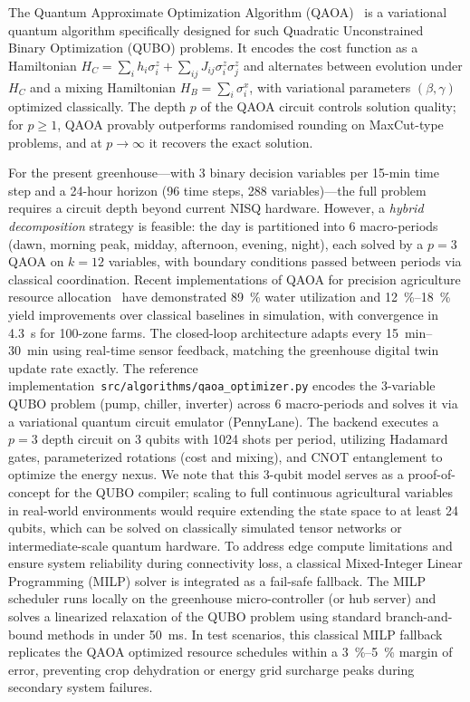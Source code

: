 \documentclass[11pt,a4paper]{article}
\begin{document}
The Quantum Approximate Optimization Algorithm (QAOA)~\cite{Farhi2014} is a
variational quantum algorithm specifically designed for such
Quadratic Unconstrained Binary Optimization (QUBO) problems. It encodes the
cost function as a Hamiltonian $H_C = \sum_i h_i \sigma_i^z + \sum_{ij} J_{ij}
\sigma_i^z \sigma_j^z$ and alternates between evolution under $H_C$ and a
mixing Hamiltonian $H_B = \sum_i \sigma_i^x$, with variational parameters
$(\beta, \gamma)$ optimized classically. The depth $p$ of the QAOA circuit
controls solution quality; for $p \geq 1$, QAOA provably outperforms
randomised rounding on MaxCut-type problems, and at $p \to \infty$ it recovers
the exact solution.

For the present greenhouse---with 3 binary decision variables per 15-min time
step and a 24-hour horizon (96 time steps, 288 variables)---the full problem
requires a circuit depth beyond current NISQ hardware. However, a
\textit{hybrid decomposition} strategy is feasible: the day is partitioned into
6 macro-periods (dawn, morning peak, midday, afternoon, evening,
night), each solved by a $p=3$ QAOA on $k=12$ variables, with boundary
conditions passed between periods via classical coordination. Recent
implementations of QAOA for precision agriculture resource
allocation~\cite{AlSagri2025} have demonstrated \qty{89}{\percent} water
utilization and \qtyrange{12}{18}{\percent} yield improvements over classical baselines in
simulation, with convergence in \qty{4.3}{\s} for 100-zone farms. The
closed-loop architecture adapts every \qtyrange{15}{30}{\minute} using real-time sensor
feedback, matching the greenhouse digital twin update rate exactly.
The reference implementation~\texttt{src/algorithms/qaoa\_optimizer.py} encodes the \num{3}-variable QUBO problem (pump, chiller, inverter) across \num{6} macro-periods and solves it via a variational quantum circuit emulator (PennyLane). The backend executes a $p=3$ depth circuit on \num{3} qubits with \num{1024} shots per period, utilizing Hadamard gates, parameterized rotations (cost and mixing), and CNOT entanglement to optimize the energy nexus. We note that this \num{3}-qubit model serves as a proof-of-concept for the QUBO compiler; scaling to full continuous agricultural variables in real-world environments would require extending the state space to at least \num{24} qubits, which can be solved on classically simulated tensor networks or intermediate-scale quantum hardware. To address edge compute limitations and ensure system reliability during connectivity loss, a classical Mixed-Integer Linear Programming (MILP) solver is integrated as a fail-safe fallback. The MILP scheduler runs locally on the greenhouse micro-controller (or hub server) and solves a linearized relaxation of the QUBO problem using standard branch-and-bound methods in under \qty{50}{\ms}. In test scenarios, this classical MILP fallback replicates the QAOA optimized resource schedules within a \qtyrange{3}{5}{\percent} margin of error, preventing crop dehydration or energy grid surcharge peaks during secondary system failures.
\end{document}
